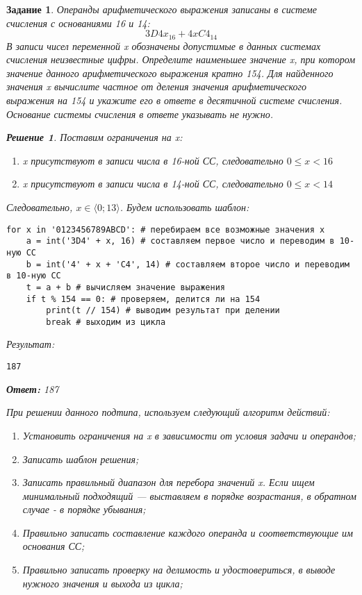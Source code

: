 \documentclass[12pt]{article}
\theoremstyle{problem_style}
\newtheorem{problem}{Задание}[subsection]
\newtheorem{solution}{Решение}[subsection]
\begin{document}
\begin{problem}
Операнды арифметического выражения записаны в системе счисления с основаниями 16 и 14:
\[
3D4x_{16} + 4xC4_{14}
\]
В записи чисел переменной x обозначены допустимые в данных системах счисления неизвестные цифры. Определите наименьшее значение x, при котором значение данного арифметического выражения кратно 154. Для найденного значения x вычислите частное от деления значения арифметического выражения на 154 и укажите его в ответе в десятичной системе счисления. Основание системы счисления в ответе указывать не нужно.
\begin{solution}
Поставим ограничения на x:
\begin{enumerate}
    \item x присутствуют в записи числа в 16-ной СС, следовательно $0 \leqslant x < 16$
    \item x присутствуют в записи числа в 14-ной СС, следовательно $0 \leqslant x < 14$
\end{enumerate}
Следовательно, $x \in \langle 0; 13 \rangle$. Будем использовать шаблон:
\begin{verbatim}
for x in '0123456789ABCD': # перебираем все возможные значения x
    a = int('3D4' + x, 16) # составляем первое число и переводим в 10-ную СС
    b = int('4' + x + 'C4', 14) # составляем второе число и переводим в 10-ную СС
    t = a + b # вычисляем значение выражения
    if t % 154 == 0: # проверяем, делится ли на 154
        print(t // 154) # выводим результат при делении
        break # выходим из цикла
\end{verbatim}
Результат:
\begin{verbatim}
187
\end{verbatim}
\textbf{Ответ:} 187
\end{solution}
При решении данного подтипа, используем следующий алгоритм действий:
\begin{enumerate}
    \item Установить ограничения на x в зависимости от условия задачи и операндов;
    \item Записать шаблон решения;
    \item Записать правильный диапазон для перебора значений x. Если ищем минимальный подходящий — выставляем в порядке возрастания, в обратном случае - в порядке убывания;
    \item Правильно записать составление каждого операнда и соответствующие им основания СС;
    \item Правильно записать проверку на делимость и удостовериться, в выводе нужного значения и выхода из цикла;
\end{enumerate}
\end{problem}
\end{document}
